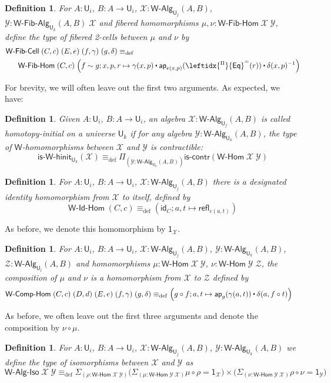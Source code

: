 \documentclass[reqno,10pt,a4paper,oneside]{amsart}
\numberwithin{equation}{section}
\theoremstyle{mythm}
\theoremstyle{mydef}
\newtheorem{definition}[theorem]{Definition}
\theoremstyle{myrmk}
\newcommand{\deq}{\equiv}
\newcommand{\defeq}{\deq_{\mathrm{def}}}
\newcommand{\idfun}[1]{\mathsf{id}_{#1}}
\newcommand{\comp}{\circ}
\newcommand{\iscontr}{\mathsf{is}\text{-}\mathsf{contr}}
\newcommand{\ct}{%
  \mathchoice{\mathbin{\raisebox{0.5ex}{$\displaystyle\centerdot$}}}%
             {\mathbin{\raisebox{0.5ex}{$\centerdot$}}}%
             {\mathbin{\raisebox{0.25ex}{$\scriptstyle\,\centerdot\,$}}}%
             {\mathbin{\raisebox{0.1ex}{$\scriptscriptstyle\,\centerdot\,$}}}}
\newcommand{\funext}{\leftidx{^\Pi}{\mathsf{Eq}}^{=}}
\newcommand{\prd}[1]{\Pi_{#1}}
\newcommand{\sm}[1]{\Sigma_{#1}}
\newcommand{\app}{\mathsf{ap}}
\newcommand{\refl}{\mathsf{refl}}
\newcommand{\W}{\mathsf{W}}
\newcommand{\one}{\mathsf{1}}
\newcommand{\UU}{\mathsf{U}}
\newcommand{\WFibCell}{\mathsf{W}\text{-}\mathsf{Fib}\text{-}\mathsf{Cell}}
\newcommand{\WAlg}{\mathsf{W}\text{-}\mathsf{Alg}}
\newcommand{\WFibAlg}{\mathsf{W}\text{-}\mathsf{Fib}\text{-}\mathsf{Alg}}
\newcommand{\WHom}{\mathsf{W}\text{-}\mathsf{Hom}}
\newcommand{\WFibHom}{\mathsf{W}\text{-}\mathsf{Fib}\text{-}\mathsf{Hom}}
\newcommand{\IsWHInit}{\mathsf{is}\text{-}\mathsf{\W}\text{-}\mathsf{hinit}}
\newcommand{\WIdHom}{\mathsf{W}\text{-}\mathsf{Id}\text{-}\mathsf{Hom}}
\newcommand{\WCompHom}{\mathsf{W}\text{-}\mathsf{Comp}\text{-}\mathsf{Hom}}
\newcommand{\WAlgIso}{\mathsf{W}\text{-}\mathsf{Alg}\text{-}\mathsf{Iso}}
\newcommand{\X}{\mathcal{X}}
\newcommand{\Y}{\mathcal{Y}}
\newcommand{\Z}{\mathcal{Z}}
\begin{document}
\begin{definition}\label{def:WFibCell}
For $A:\UU_i$, $B : A \to \UU_i$, $\X : \WAlg_{\UU_j}(A,B)$, $\Y : \WFibAlg_{\UU_k}(A,B) \; \X$ and fibered homomorphisms $\mu, \nu : \WFibHom \; \X \; \Y$, define the type of \emph{fibered 2-cells} between $\mu$ and $\nu$ by
\begin{align*} & \WFibCell \; (C,c) \; (E, e) \; (f,\gamma) \; (g,\delta) \defeq \\ & \;\;\; \;\;\;\WFibHom \; (C,c) \; \Big(f \sim g; x,p,r \mapsto \gamma(x,p) \ct \app_{e(x,p)}(\funext(r)) \ct \delta(x,p)^{-1}\Big)
\end{align*}
\end{definition}
For brevity, we will often leave out the first two arguments. As expected, we have:
\begin{definition}\label{def:WHInit}
Given $A:\UU_i$, $B : A \to \UU_i$, an algebra $\X : \WAlg_{\UU_j}(A,B)$ is called \emph{homotopy-initial} on a universe $\UU_k$ if for any algebra $\Y : \WAlg_{\UU_k}(A,B)$, the type of $\W$-homomorphisms between $\X$ and $\Y$ is contractible:
\[ \IsWHInit_{\UU_k}(\X) \defeq \prd{(\Y:\WAlg_{\UU_k}(A,B))} \iscontr(\WHom \; \X \; \Y) \]  
\end{definition}

\begin{definition}
For $A:\UU_i$, $B : A \to \UU_i$, $\X : \WAlg_{\UU_j}(A,B)$ there is a designated \emph{identity} homomorphism from $\X$ to itself, defined by
\[ \WIdHom \; (C,c) \defeq (\idfun{C}; a,t \mapsto \refl_{c(a,t)}) \]
\end{definition}
As before, we denote this homomorphism by $\one_\X$.

\begin{definition}
For $A:\UU_i$, $B : A \to \UU_i$, $\X : \WAlg_{\UU_j}(A,B)$, $\Y : \WAlg_{\UU_k}(A,B)$, $\Z : \WAlg_{\UU_l}(A,B)$ and homomorphisms $\mu : \WHom \; \X \; \Y$, $\nu : \WHom \; \Y \; \Z$, the \emph{composition} of $\mu$ and $\nu$ is a homomorphism from $\X$ to $\Z$ defined by
\begin{align*} & \WCompHom \; (C,c) \; (D,d) \; (E,e) \; (f,\gamma) \; (g,\delta) \defeq  \Big(g \comp f; a,t \mapsto \app_g(\gamma(a,t)) \ct \delta(a, f \comp t) \Big)
\end{align*}
\end{definition}
As before, we often leave out the first three arguments and denote the composition by $\nu \comp \mu$.

\begin{definition}
For $A:\UU_i$, $B : A \to \UU_i$, $\X : \WAlg_{\UU_j}(A,B)$, $\Y : \WAlg_{\UU_k}(A,B)$ we define the type of \emph{isomorphisms} between $\X$ and $\Y$ as
\[\WAlgIso \; \X \; \Y \defeq \sm{(\rho : \WHom \; \X \; \Y)} \Big(\sm{(\mu : \WHom \; \Y \; \X)} \mu \comp \rho = \one_\X \Big) \times \Big(\sm{(\nu : \WHom \; \Y \; \X)} \rho \comp \nu = \one_\Y \Big) \] 
\end{definition}
\end{document}
